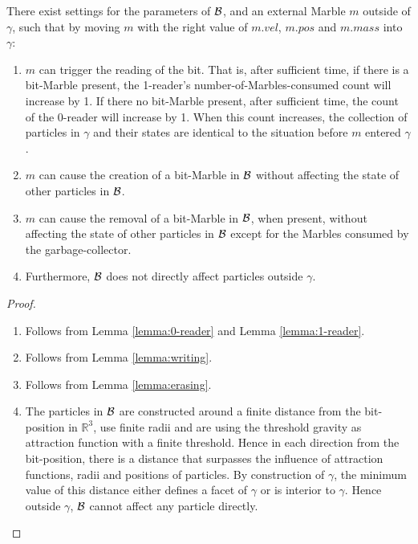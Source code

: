 \begin{theorem}
    There exist settings for the parameters of $\mathcal{B}$, and an external Marble $m$ outside of $\gamma$, such that by moving $m$ with the right value of $m.vel$, $m.pos$ and $m.mass$ into $\gamma$:
    \begin{enumerate}
        \item $m$ can trigger the reading of the bit. That is, after sufficient time, if there is a bit-Marble present, the 1-reader's number-of-Marbles-consumed count will increase by 1. If there no bit-Marble present, after sufficient time, the count of the 0-reader will increase by 1. When this count increases, the collection of particles in $\gamma$ and their states are identical to the situation before $m$ entered $\gamma$.
        \item $m$ can cause the creation of a bit-Marble in $\mathcal{B}$ without affecting the state of other particles in $\mathcal{B}$.
        \item $m$ can cause the removal of a bit-Marble in $\mathcal{B}$, when present, without affecting the state of other particles in $\mathcal{B}$ except for the Marbles consumed by the garbage-collector.
        \item Furthermore, $\mathcal{B}$ does not directly affect particles outside $\gamma$.
    \end{enumerate}
\end{theorem}
\begin{proof}
    \begin{enumerate}
        \item Follows from Lemma \ref{lemma:0-reader} and Lemma \ref{lemma:1-reader}.
        \item Follows from Lemma \ref{lemma:writing}.
        \item Follows from Lemma \ref{lemma:erasing}.
        \item The particles in $\mathcal{B}$ are constructed around a finite distance from the bit-position in $\mathbb{R}^3$, use finite radii and are using the threshold gravity as attraction function with a finite threshold. Hence in each direction from the bit-position, there is a distance that surpasses the influence of attraction functions, radii and positions of particles. By construction of $\gamma$, the minimum value of this distance either defines a facet of $\gamma$ or is interior to $\gamma$. Hence outside $\gamma$, $\mathcal{B}$ cannot affect any particle directly.
    \end{enumerate}
\end{proof}